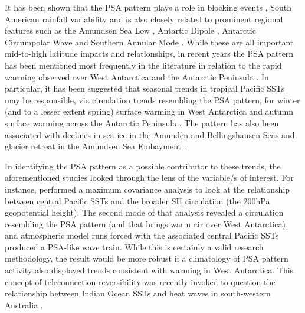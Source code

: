 It has been shown that the PSA pattern plays a role in blocking events \citep{Sinclair1997,Renwick1999}, South American rainfall variability \citep{Mo2001} and is also closely related to prominent regional features such as the Amundsen Sea Low \citep{Turner2013}, Antartic Dipole \citep{Yuan2001}, Antarctic Circumpolar Wave \citep{Christoph1998} and Southern Annular Mode \citep[SAM; e.g.][]{Ding2012}. While these are all important mid-to-high latitude impacts and relationships, in recent years the PSA pattern has been mentioned most frequently in the literature in relation to the rapid warming observed over West Antarctica and the Antarctic Peninsula \citep{Nicolas2014}. In particular, it has been suggested that seasonal trends in tropical Pacific SSTs may be responsible, via circulation trends resembling the PSA pattern, for winter (and to a lesser extent spring) surface warming in West Antarctica \citep{Ding2011} and autumn surface warming across the Antarctic Peninsula \citep{Ding2013}. The pattern has also been associated with declines in sea ice in the Amunden and Bellingshausen Seas \citep{Schneider2012} and glacier retreat in the Amundsen Sea Embayment \citep{Steig2012}.

In identifying the PSA pattern as a possible contributor to these trends, the aforementioned studies looked through the lens of the variable/s of interest. For instance, \citet{Ding2011} performed a maximum covariance analysis to look at the relationship between central Pacific SSTs and the broader SH circulation (the 200hPa geopotential height). The second mode of that analysis revealed a circulation resembling the PSA pattern (and that brings warm air over West Antarctica), and atmospheric model runs forced with the associated central Pacific SSTs produced a PSA-like wave train. While this is certainly a valid research methodology, the result would be more robust if a climatology of PSA pattern activity also displayed trends consistent with warming in West Antarctica. This concept of teleconnection reversibility was recently invoked to question the relationship between Indian Ocean SSTs and heat waves in south-western Australia \citep{Boschat2016}.   

